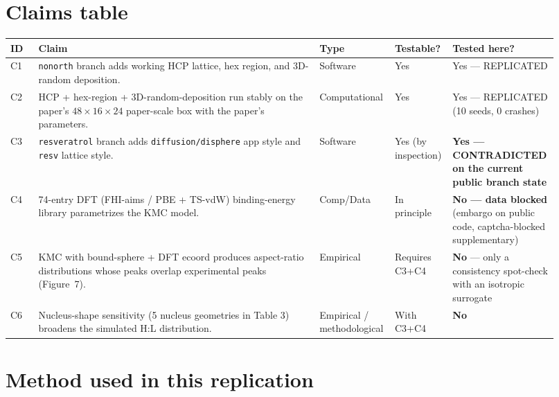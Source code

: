 \documentclass[11pt]{article}
\begin{document}
\section{Claims table}

\begin{longtable}{@{}p{0.05\linewidth}p{0.5\linewidth}p{0.13\linewidth}p{0.1\linewidth}p{0.14\linewidth}@{}}
\toprule
ID & Claim & Type & Testable? & Tested here? \\
\midrule
\endhead
C1 & \texttt{nonorth} branch adds working HCP lattice, hex region, and 3D-random deposition. & Software & Yes & Yes --- REPLICATED \\
C2 & HCP + hex-region + 3D-random-deposition run stably on the paper's $48\!\times\!16\!\times\!24$ paper-scale box with the paper's parameters. & Computational & Yes & Yes --- REPLICATED (10 seeds, 0 crashes) \\
C3 & \texttt{resveratrol} branch adds \texttt{diffusion/disphere} app style and \texttt{resv} lattice style. & Software & Yes (by inspection) & \textbf{Yes --- CONTRADICTED on the current public branch state} \\
C4 & 74-entry DFT (FHI-aims / PBE + TS-vdW) binding-energy library parametrizes the KMC model. & Comp/Data & In principle & \textbf{No --- data blocked} (embargo on public code, captcha-blocked supplementary) \\
C5 & KMC with bound-sphere + DFT ecoord produces aspect-ratio distributions whose peaks overlap experimental peaks (Figure~7). & Empirical & Requires C3+C4 & \textbf{No} --- only a consistency spot-check with an isotropic surrogate \\
C6 & Nucleus-shape sensitivity (5 nucleus geometries in Table 3) broadens the simulated H:L distribution. & Empirical / methodological & With C3+C4 & \textbf{No} \\
\bottomrule
\end{longtable}

\section{Method used in this replication}
\end{document}
